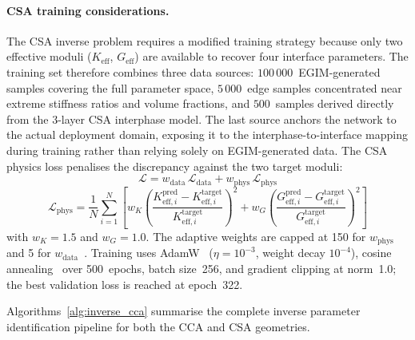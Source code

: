 \documentclass[oneside, 12pt, a4paper, bibliography=totoc]{book}
\begin{document}
\paragraph{CSA training considerations.}
\label{subsec:inverse_pinn}
The CSA inverse problem requires a modified training strategy because only two effective moduli ($K_{\text{eff}}$, $G_{\text{eff}}$) are available to recover four interface parameters. The training set therefore combines three data sources: $100\,000$~EGIM-generated samples covering the full parameter space, 
$5\,000$~edge samples concentrated near extreme stiffness ratios and volume fractions, and $500$~samples derived directly from the 3-layer CSA interphase model. The last source anchors the network to the actual deployment domain, exposing it to the interphase-to-interface mapping during training rather than relying solely on EGIM-generated data. The CSA physics loss penalises the discrepancy against the two target moduli:
%
\begin{equation}
\label{eq:pinn_loss}
    \mathcal{L} = w_{\text{data}} \, \mathcal{L}_{\text{data}} + w_{\text{phys}} \, \mathcal{L}_{\text{phys}}
\end{equation}
%
\begin{equation}
\label{eq:pinn_physics_loss}
    \mathcal{L}_{\text{phys}} = \frac{1}{N}\sum_{i=1}^{N} \left[ w_K \left(\frac{K_{\text{eff},i}^{\text{pred}} - K_{\text{eff},i}^{\text{target}}}{K_{\text{eff},i}^{\text{target}}}\right)^{2} + w_G \left(\frac{G_{\text{eff},i}^{\text{pred}} - G_{\text{eff},i}^{\text{target}}}{G_{\text{eff},i}^{\text{target}}}\right)^{2} \right]
\end{equation}
%
with $w_K = 1.5$ and $w_G = 1.0$. The adaptive weights are capped at 150 for $w_{\text{phys}}$ and 5 for $w_{\text{data}}$~\cite{Bischof2021}. Training uses AdamW~\cite{Loshchilov2019} ($\eta = 10^{-3}$, weight decay $10^{-4}$), cosine annealing~\cite{Loshchilov2017} over 500~epochs, batch size~256, and gradient clipping at norm~1.0; the best validation loss is reached at epoch~322.

Algorithms~\ref{alg:inverse_cca} summarise the complete inverse parameter identification pipeline for both the CCA and CSA geometries.
\end{document}

